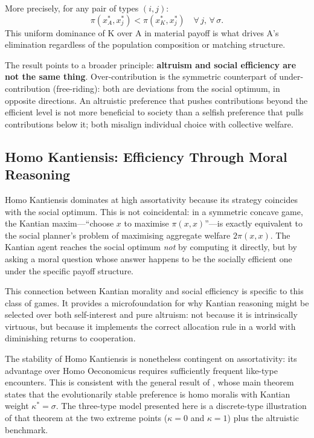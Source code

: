 \documentclass[12pt]{article}
\begin{document}
More precisely, for any pair of types $(i, j)$:
$$\pi(x_A^*, x_j^*) < \pi(x_K^*, x_j^*) \quad \forall\, j,\, \forall\, \sigma.$$
This uniform dominance of K over A in material payoff is what drives A's elimination regardless of the population composition or matching structure.

The result points to a broader principle: \textbf{altruism and social efficiency are not the same thing}. Over-contribution is the symmetric counterpart of under-contribution (free-riding): both are deviations from the social optimum, in opposite directions. An altruistic preference that pushes contributions beyond the efficient level is not more beneficial to society than a selfish preference that pulls contributions below it; both misalign individual choice with collective welfare.

\subsection{Homo Kantiensis: Efficiency Through Moral Reasoning}

Homo Kantiensis dominates at high assortativity because its strategy coincides with the social optimum. This is not coincidental: in a symmetric concave game, the Kantian maxim---``choose $x$ to maximise $\pi(x,x)$''---is exactly equivalent to the social planner's problem of maximising aggregate welfare $2\pi(x,x)$. The Kantian agent reaches the social optimum \emph{not} by computing it directly, but by asking a moral question whose answer happens to be the socially efficient one under the specific payoff structure.

This connection between Kantian morality and social efficiency is specific to this class of games. It provides a microfoundation for why Kantian reasoning might be selected over both self-interest and pure altruism: not because it is intrinsically virtuous, but because it implements the correct allocation rule in a world with diminishing returns to cooperation.

The stability of Homo Kantiensis is nonetheless contingent on assortativity: its advantage over Homo Oeconomicus requires sufficiently frequent like-type encounters. This is consistent with the general result of \citet{AlgerWeibull2013}, whose main theorem states that the evolutionarily stable preference is homo moralis with Kantian weight $\kappa^* = \sigma$. The three-type model presented here is a discrete-type illustration of that theorem at the two extreme points ($\kappa = 0$ and $\kappa = 1$) plus the altruistic benchmark.
\end{document}
